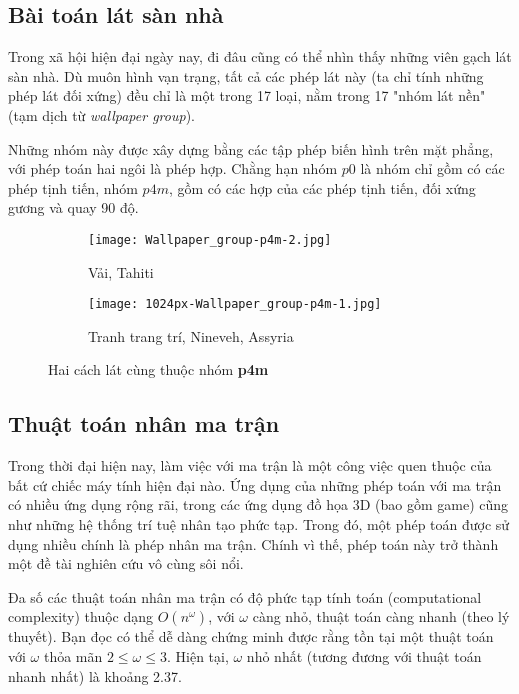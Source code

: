 \subsection{Bài toán lát sàn nhà}

Trong xã hội hiện đại ngày nay, đi đâu cũng có thể nhìn thấy những viên gạch lát sàn nhà. Dù muôn hình vạn trạng, tất cả các phép lát này (ta chỉ tính những phép lát đối xứng) đều chỉ là một trong 17 loại, nằm trong 17 "nhóm lát nền" (tạm dịch từ \textit{wallpaper group}).

Những nhóm này được xây dựng bằng các tập phép biến hình trên mặt phẳng, với phép toán hai ngôi là phép hợp. Chằng hạn nhóm $p0$ là nhóm chỉ gồm có các phép tịnh tiến, nhóm $p4m$, gồm có các hợp của các phép tịnh tiến, đối xứng gương và quay 90 độ.

\begin{figure}
\centering
\begin{subfigure}{.5\textwidth}
	\centering
	\texttt{[image: Wallpaper\_group-p4m-2.jpg]}
	\caption{Vải, Tahiti}
\end{subfigure}%
\begin{subfigure}{.5\textwidth}
	\centering
\texttt{[image: 1024px-Wallpaper\_group-p4m-1.jpg]}
\caption{Tranh trang trí, Nineveh, Assyria}
\end{subfigure}%
	\caption{Hai cách lát cùng thuộc nhóm \textbf{p4m}}
\end{figure}

\subsection{Thuật toán nhân ma trận}

Trong thời đại hiện nay, làm việc với ma trận là một công việc quen thuộc của bất cứ chiếc máy tính hiện đại nào. Ứng dụng của những phép toán với ma trận có nhiều ứng dụng rộng rãi, trong các ứng dụng đồ họa 3D (bao gồm game) cũng như những hệ thống trí tuệ nhân tạo phức tạp. Trong đó, một phép toán được sử dụng nhiều chính là phép nhân ma trận. Chính vì thế, phép toán này trở thành một đề tài nghiên cứu vô cùng sôi nổi. 

Đa số các thuật toán nhân ma trận có độ phức tạp tính toán (computational complexity) thuộc dạng $O(n^\omega)$, với $\omega$ càng nhỏ, thuật toán càng nhanh (theo lý thuyết). Bạn đọc có thể dễ dàng chứng minh được rằng tồn tại một thuật toán với $\omega$ thỏa mãn $2 \le \omega \le 3$. Hiện tại, $\omega$ nhỏ nhất (tương đương với thuật toán nhanh nhất) là khoảng 2.37. 

